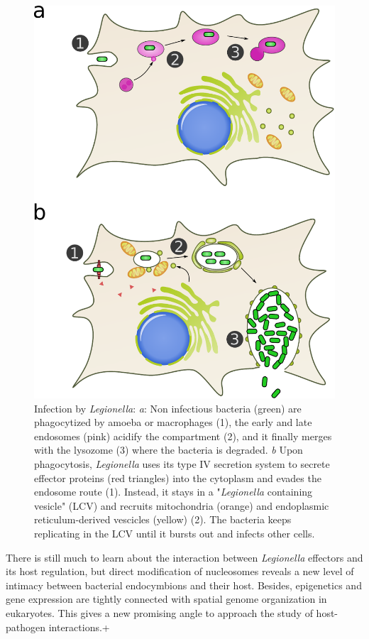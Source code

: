 \begin{figure}[b]
    \includegraphics[width=\textwidth]{Parts/Part01/gfx/legionella_life_cycle.pdf}
    \caption{Infection by \textit{Legionella}: \textit{a}: Non infectious bacteria (green) are phagocytized by amoeba or macrophages (1), the early and late endosomes (pink) acidify the compartment (2), and it finally merges with the lysozome (3) where the bacteria is degraded. \textit{b} Upon phagocytosis, \textit{Legionella} uses its type IV secretion system to secrete effector proteins (red triangles) into the cytoplasm and evades the endosome route (1). Instead, it stays in a "\textit{Legionella} containing vesicle" (LCV) and recruits mitochondria (orange) and endoplasmic reticulum-derived vescicles (yellow) (2). The bacteria keeps replicating in the LCV until it bursts out and infects other cells.}
	\label{fig:01-01:legionella}
\end{figure}

There is still much to learn about the interaction between \textit{Legionella} effectors and its host regulation, but direct modification of nucleosomes reveals a new level of intimacy between bacterial endocymbions and their host. Besides, epigenetics and gene expression are tightly connected with spatial genome organization in eukaryotes. This gives a new promising angle to approach the study of host-pathogen interactions.+


